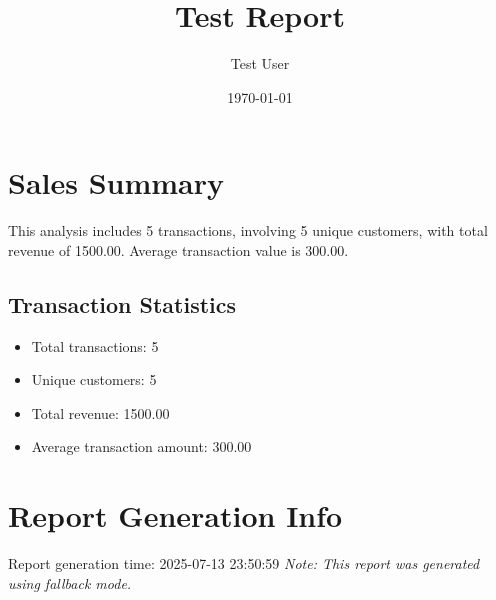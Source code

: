 \documentclass{article}
\title{Test Report}
\author{Test User}
\date{\today}
\begin{document}
\maketitle

\section{Sales Summary}
This analysis includes 5 transactions,
involving 5 unique customers,
with total revenue of 1500.00.
Average transaction value is 300.00.

\subsection{Transaction Statistics}
\begin{itemize}
\item Total transactions: 5
\item Unique customers: 5
\item Total revenue: 1500.00
\item Average transaction amount: 300.00
\end{itemize}

\section{Report Generation Info}
Report generation time: 2025-07-13 23:50:59
\textit{Note: This report was generated using fallback mode.}
\end{document}
